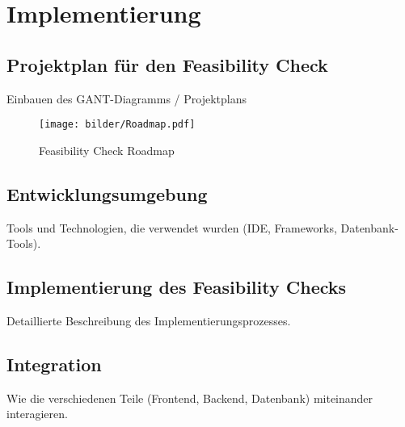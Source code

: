 \chapter{Implementierung}\label{Chap:Implementierung}

\section{Projektplan für den Feasibility Check}
Einbauen des GANT-Diagramms / Projektplans


\begin{figure}[!h]
    \centering
    \texttt{[image: bilder/Roadmap.pdf]}
    \caption{Feasibility Check Roadmap}
    \label{fig:roadmap}
\end{figure}
\section{Entwicklungsumgebung}
Tools und Technologien, die verwendet wurden (IDE, Frameworks, Datenbank-Tools).
\section{Implementierung des Feasibility Checks}
Detaillierte Beschreibung des Implementierungsprozesses.
\section{Integration}
Wie die verschiedenen Teile (Frontend, Backend, Datenbank) miteinander interagieren.